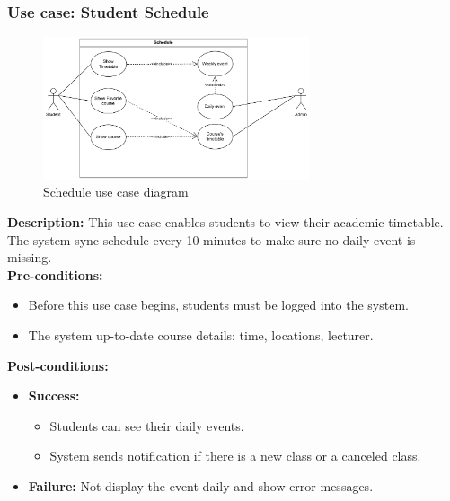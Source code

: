 \documentclass{article}
\begin{document}
    

\subsubsection{Use case: Student Schedule}
    \begin{figure}[H]
        \centering
        \includegraphics[width=0.7\textwidth]{image/StudentScheduleUseCase.pdf} 
        \caption{Schedule use case diagram}
        \label{fig:schedule_use_case}
    \end{figure}
    \textbf{Description:} This use case enables students to view their academic timetable. The system sync schedule every 10 minutes to make sure no daily event is missing. \\

    \noindent \textbf{Pre-conditions:} 
        \begin{itemize}
            \item Before this use case begins, students must be logged into the system.
            \item The system up-to-date course details: time, locations, lecturer.
        \end{itemize}
    
    \pagebreak

    \noindent \textbf{Post-conditions:}
    \begin{itemize}
        \item \textbf{Success:} 
        \begin{itemize}
            \item Students can see their daily events.
            \item System sends notification if there is a new class or a canceled class.
        \end{itemize}
        \item \textbf{Failure:} Not display the event daily and show error messages.
    \end{itemize}
\end{document}
